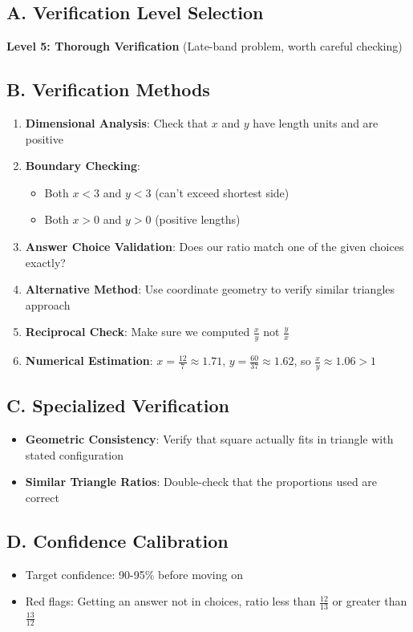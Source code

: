 \documentclass[]{article}
\begin{document}
\begin{verificationbox}
\subsection*{A. Verification Level Selection}
\textbf{Level 5: Thorough Verification} (Late-band problem, worth careful checking)

\subsection*{B. Verification Methods}
\begin{enumerate}[leftmargin=*]
    \item \textbf{Dimensional Analysis}: Check that $x$ and $y$ have length units and are positive
    \item \textbf{Boundary Checking}: 
    \begin{itemize}
        \item Both $x < 3$ and $y < 3$ (can't exceed shortest side)
        \item Both $x > 0$ and $y > 0$ (positive lengths)
    \end{itemize}
    \item \textbf{Answer Choice Validation}: Does our ratio match one of the given choices exactly?
    \item \textbf{Alternative Method}: Use coordinate geometry to verify similar triangles approach
    \item \textbf{Reciprocal Check}: Make sure we computed $\frac{x}{y}$ not $\frac{y}{x}$
    \item \textbf{Numerical Estimation}: $x = \frac{12}{7} \approx 1.71$, $y = \frac{60}{37} \approx 1.62$, so $\frac{x}{y} \approx 1.06 > 1$
\end{enumerate}

\subsection*{C. Specialized Verification}
\begin{itemize}[leftmargin=*]
    \item \textbf{Geometric Consistency}: Verify that square actually fits in triangle with stated configuration
    \item \textbf{Similar Triangle Ratios}: Double-check that the proportions used are correct
\end{itemize}

\subsection*{D. Confidence Calibration}
\begin{itemize}[leftmargin=*]
    \item Target confidence: 90-95\% before moving on
    \item Red flags: Getting an answer not in choices, ratio less than $\frac{12}{13}$ or greater than $\frac{13}{12}$
\end{itemize}
\end{verificationbox}
\end{document}
